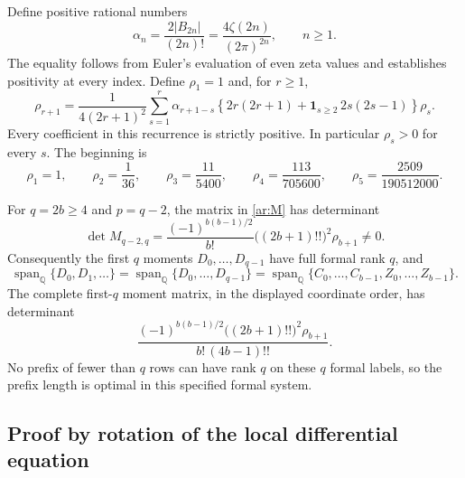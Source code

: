 Define positive rational numbers
\begin{equation}\label{ar:alpha}
 \alpha_n=\frac{2|B_{2n}|}{(2n)!}
         =\frac{4\zeta(2n)}{(2\pi)^{2n}},\qquad n\ge1.
\end{equation}
The equality follows from Euler's evaluation of even zeta values and
establishes positivity at every index. Define $\rho_1=1$ and, for $r\ge1$,
\begin{equation}\label{ar:rho}
 \rho_{r+1}=
 \frac{1}{4(2r+1)^2}
 \sum_{s=1}^r\alpha_{r+1-s}
  \left\{2r(2r+1)
       +\mathbf1_{s\ge2}\,2s(2s-1)\right\}\rho_s.
\end{equation}
Every coefficient in this recurrence is strictly positive. In particular
$\rho_s>0$ for every $s$. The beginning is
\[
 \rho_1=1,\qquad \rho_2=\frac1{36},\qquad
 \rho_3=\frac{11}{5400},\qquad
 \rho_4=\frac{113}{705600},\qquad
 \rho_5=\frac{2509}{190512000}.
\]

\begin{theorem}
\label{ar:main}
For $q=2b\ge4$ and $p=q-2$, the matrix in \eqref{ar:M} has determinant
\begin{equation}\label{ar:det}
 \boxed{\displaystyle
 \det M_{q-2,q}
 =\frac{(-1)^{b(b-1)/2}}{b!}
       \bigl((2b+1)!!\bigr)^2\rho_{b+1}\ne0.}
\end{equation}
Consequently the first $q$ moments $D_0,\ldots,D_{q-1}$ have full
formal rank $q$, and
\begin{equation}\label{ar:spans}
 \operatorname{span}_{\mathbb Q}\{D_0,D_1,\ldots\}
 =\operatorname{span}_{\mathbb Q}\{D_0,\ldots,D_{q-1}\}
 =\operatorname{span}_{\mathbb Q}
     \{C_0,\ldots,C_{b-1},Z_0,\ldots,Z_{b-1}\}.
\end{equation}
The complete first-$q$ moment matrix, in the displayed coordinate order,
has determinant
\begin{equation}\label{ar:complete}
 \frac{(-1)^{b(b-1)/2}\bigl((2b+1)!!\bigr)^2\rho_{b+1}}
      {b!\,(4b-1)!!}.
\end{equation}
No prefix of fewer than $q$ rows can have rank $q$ on these $q$ formal
labels, so the prefix length is optimal in this specified formal system.
\end{theorem}

\subsection{Proof by rotation of the local differential equation}

